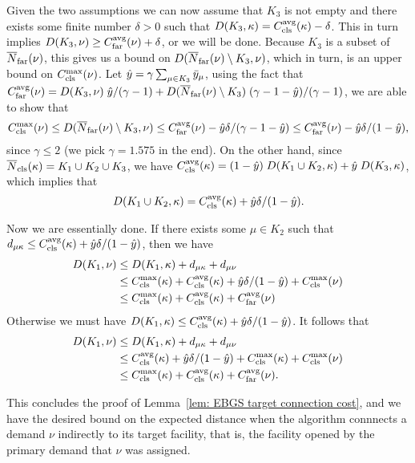 \documentclass[11pt]{article}
\begin{document}
  Given the two assumptions we can now assume that $K_3$ is not empty
  and there exists some finite number $\delta > 0$ such that $D(K_3,
  \kappa) = \clsdist(\kappa) - \delta$. This in turn implies $D(K_3,
  \nu) \geq \fardist(\nu) + \delta$, or we will be done. Because $K_3$
  is a subset of $\wbarfarnb(\nu)$, this gives us a bound on
  $D(\wbarfarnb(\nu) \setminus K_3, \nu)$, which in turn, is an upper
  bound on $\clsmax(\nu)$. Let $\hat{y} = \gamma \sum_{\mu\in K_3}
  \bary_{\mu}$, using the fact that $\fardist(\nu) = D(K_3,\nu)\;
  \hat{y}/(\gamma-1) + D(\wbarfarnb(\nu)\setminus K_3)\;
  (\gamma-1-\hat{y})/(\gamma-1)$, we are able to show that
  \begin{equation*}
    \clsmax(\nu) \leq D(\wbarfarnb(\nu) \setminus K_3, \nu) \leq \fardist(\nu) -
    \hat{y}\delta/(\gamma-1-\hat{y}) \leq \fardist(\nu) -
    \hat{y}\delta/(1-\hat{y}),
  \end{equation*}
  since $\gamma \leq 2$ (we pick $\gamma=1.575$ in the end). On the
  other hand, since $\wbarclsnb(\kappa) = K_1 \cup K_2 \cup K_3$, we
  have $\clsdist(\kappa) = (1-\hat{y})\; D(K_1\cup K_2, \kappa) +
  \hat{y}\; D(K_3, \kappa)$, which implies that
  \begin{equation*}
    D(K_1 \cup K_2, \kappa) = \clsdist(\kappa) + \hat{y}\delta/(1-\hat{y}).
  \end{equation*}

  Now we are essentially done. If there exists some $\mu \in K_2$ such
  that $d_{\mu\kappa} \leq \clsdist(\kappa) +
  \hat{y}\delta/(1-\hat{y})$, then we have
  \begin{align*}
    D(K_1, \nu) &\leq D(K_1, \kappa) + d_{\mu\kappa} + d_{\mu\nu} \\
    &\leq \clsmax(\kappa) + \clsdist(\kappa) +
    \hat{y}\delta/(1-\hat{y})
    + \clsmax(\nu)\\
    &\leq \clsmax(\kappa) + \clsdist(\kappa) + \fardist(\nu)
  \end{align*}
  Otherwise we must have $D(K_1, \kappa) \leq \clsdist(\kappa) +
  \hat{y}\delta/(1-\hat{y})$. It follows that
  \begin{align*}
    D(K_1, \nu) &\leq D(K_1, \kappa) + d_{\mu\kappa} + d_{\mu\nu} \\
    &\leq \clsdist(\kappa) + \hat{y}\delta/(1-\hat{y}) +
    \clsmax(\kappa)
    + \clsmax(\nu)\\
    &\leq \clsmax(\kappa) + \clsdist(\kappa) + \fardist(\nu).
  \end{align*}

  This concludes the proof of Lemma~\ref{lem: EBGS target connection
    cost}, and we have the desired bound on the expected distance when
  the algorithm connnects a demand $\nu$ indirectly to its target
  facility, that is, the facility opened by the primary demand that
  $\nu$ was assigned.
\end{document}
